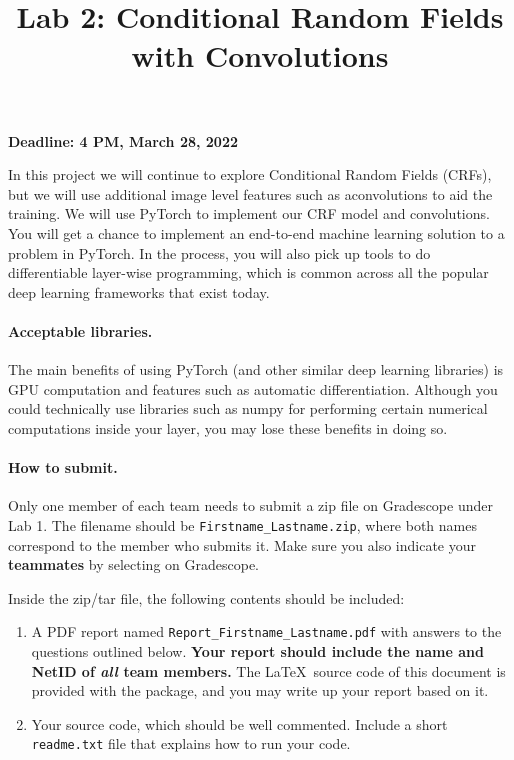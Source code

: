 \documentclass[11pt]{report}
\title{Lab 2: Conditional Random Fields with Convolutions}
\begin{document}
\maketitle

{\bf Deadline: 4 PM, March 28, 2022}

In this project we will continue to explore Conditional Random Fields (CRFs),
but we will use additional image level features such as aconvolutions to aid the
training. We will use PyTorch to implement our CRF model and convolutions. You
will get a chance to implement an end-to-end machine learning solution to a
problem in PyTorch. In the process, you will also pick up tools to do
differentiable layer-wise programming, which is common across all the popular
deep learning frameworks that exist today.

\paragraph{Acceptable libraries.}
The main benefits of using PyTorch (and other similar deep learning libraries) is GPU computation and features such as automatic differentiation. Although you could technically use libraries such as numpy for performing certain numerical computations inside your layer, you may lose these benefits in doing so. 

\paragraph{How to submit.}

Only one member of each team needs to submit a zip file on Gradescope under Lab 1.
The filename should be \verb#Firstname_Lastname.zip#,
where both names correspond to the member who submits it.
Make sure you also indicate your \textbf{teammates} by selecting on Gradescope.

Inside the zip/tar file, the following contents should be included:
\vspace{-1em}
\begin{enumerate}

  \item  A PDF report named \verb#Report_Firstname_Lastname.pdf# with answers to the questions outlined below.
    {\bf Your report should include the name and NetID of \emph{all} team members.}
    The \LaTeX\ source code of this document is provided with the package, and
    you may write up your report based on it.
  \item Your source code, which should be well commented.
    Include a short \verb#readme.txt# file that explains how to run your code.
\end{enumerate}
\vspace{-1em}
\end{document}
